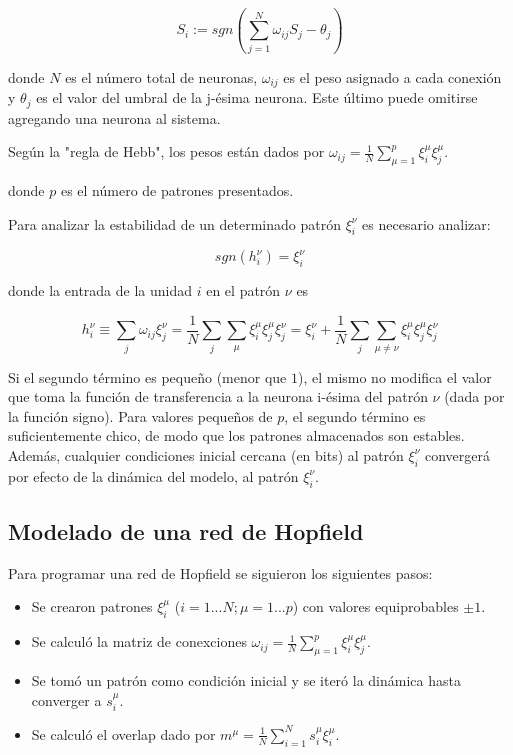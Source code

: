 \documentclass[aps,prb,onecolumn,10pt,floatfix,superscriptaddress]{article} %
\begin{document}
\begin{equation}
S_{i} := sgn (\sum^{N}_{j=1}\omega_{ij}S_{j}-\theta_{j}) 
\end{equation}

 donde $N$ es el n\'umero total de neuronas, $\omega_{ij}$ es el peso asignado a cada conexi\'on y $\theta_j$ es el valor del umbral de la j-\'esima neurona. Este \'ultimo puede omitirse agregando una neurona al sistema.

Seg\'un la "regla de Hebb", los pesos est\'an dados por $\omega_{ij} = \frac{1}{N} \sum^{p}_{\mu=1} \xi^{\mu}_{i} \xi^{\mu}_{j}$.

	donde $p$ es el n\'umero de patrones presentados.

Para analizar la estabilidad de un determinado patr\'on $\xi^{\nu}_{i}$ es necesario analizar:

\begin{equation}
sgn(h^{\nu}_{i}) = \xi^{\nu}_{i}
\end{equation}

donde la entrada de la unidad $i$ en el patr\'on $\nu$ es

\begin{equation}
h^{\nu}_{i} \equiv \sum_{j} \omega_{ij} \xi^{\nu}_{j} = \frac{1}{N} \sum_{j} \sum_{\mu} \xi^{\mu}_{i}\xi^{\mu}_{j}\xi^{\nu}_{j} = \xi^{\nu}_{i} + \frac{1}{N} \sum_{j} \sum_{\mu \neq \nu} \xi^{\mu}_{i}\xi^{\mu}_{j}\xi^{\nu}_{j}
\end{equation}

Si el segundo t\'ermino es peque\~no (menor que $1$), el mismo no modifica el valor que toma la funci\'on de transferencia a la neurona i-\'esima del patr\'on $\nu$ (dada por la funci\'on signo). Para valores peque\~nos de $p$, el segundo t\'ermino es suficientemente chico, de modo que los patrones almacenados son estables. Adem\'as, cualquier condiciones inicial cercana (en bits) al patr\'on $\xi^{\nu}_{i}$ converger\'a por efecto de la din\'amica del modelo, al patr\'on $\xi^{\nu}_{i}$.


\subsection{Modelado de una red de Hopfield}

Para programar una red de Hopfield se siguieron los siguientes pasos:

\begin{itemize}
\item  Se crearon patrones $\xi^{\mu}_{i}$ ($i=1...N;\mu = 1...p$) con valores equiprobables $\pm 1$.
\item  Se calcul\'o la matriz de conexciones $\omega_{ij} = \frac{1}{N} \sum^{p}_{\mu=1} \xi^{\mu}_{i} \xi^{\mu}_{j}$.
\item Se tom\'o un patr\'on como condici\'on inicial y se iter\'o la din\'amica hasta converger a $s^{\mu}_{i}$.
\item Se calcul\'o el overlap dado por $m^{\mu} = \frac{1}{N} \sum^{N}_{i=1} s^{\mu}_{i} \xi^{\mu}_{i}$.

\end{itemize}
\end{document}
